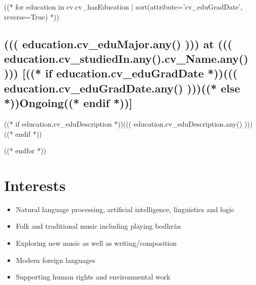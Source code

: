 \documentclass[10pt]{article}
\begin{document}
((* for education in cv.cv_hasEducation | sort(attribute='cv_eduGradDate', reverse=True) *))

\subsection*{((( education.cv_eduMajor.any() ))) at ((( education.cv_studiedIn.any().cv_Name.any() ))) [((* if education.cv_eduGradDate *))((( education.cv_eduGradDate.any() )))((* else *))Ongoing((* endif *))]}

((* if education.cv_eduDescription *))((( education.cv_eduDescription.any() )))((* endif *))

((* endfor *))


\section*{Interests}
\begin{itemize}

\item
Natural language processing, artificial intelligence, linguistics and logic
\item
Folk and traditional music including playing bodhr\'{a}n
\item
Exploring new music as well as writing/composition
\item
Modern foreign languages
\item
Supporting human rights and environmental work


\end{itemize}
\end{document}
